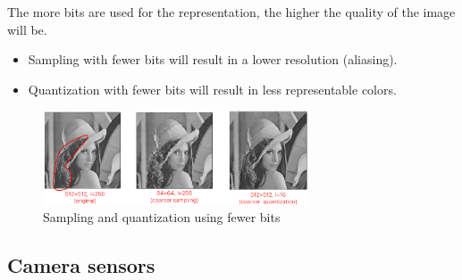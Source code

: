 \begin{remark}
    The more bits are used for the representation, the higher the quality of the image will be.
    \begin{itemize}
        \item Sampling with fewer bits will result in a lower resolution (aliasing).
        \item Quantization with fewer bits will result in less representable colors.
    \end{itemize}
    \begin{figure}[H]
        \centering
        \includegraphics[width=0.7\textwidth]{./img/_digitalization_quality.pdf}
        \caption{Sampling and quantization using fewer bits}
    \end{figure}
\end{remark}


\subsection{Camera sensors}

